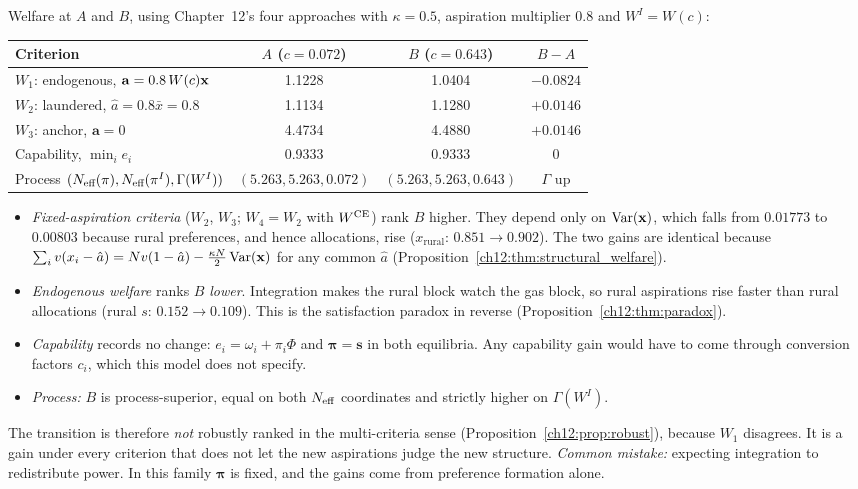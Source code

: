 \documentclass[../solutions_manual.tex]{subfiles}
\begin{document}
 Welfare at $A$ and $B$, using Chapter~12's four approaches with $\kappa = 0.5$, aspiration multiplier $0.8$ and $W^I = W(c)$:
\begin{center}
\small
\begin{tabular}{lccc}
\toprule
Criterion & $A$ ($c = 0.072$) & $B$ ($c = 0.643$) & $B - A$ \\
\midrule
$W_1$: endogenous, $\mathbf{a} = 0.8\,W(c)\mathbf{x}$ & 1.1228 & 1.0404 & $-0.0824$ \\
$W_2$: laundered, $\hat a = 0.8\bar x = 0.8$ & 1.1134 & 1.1280 & $+0.0146$ \\
$W_3$: anchor, $\mathbf{a} = 0$ & 4.4734 & 4.4880 & $+0.0146$ \\
Capability, $\min_i e_i$ & 0.9333 & 0.9333 & 0 \\
Process $(N_{\text{eff}}(\pi), N_{\text{eff}}(\pi^I), \Gamma(W^I))$ & $(5.263, 5.263, 0.072)$ & $(5.263, 5.263, 0.643)$ & $\Gamma$ up \\
\bottomrule
\end{tabular}
\end{center}
\begin{itemize}
\item \emph{Fixed-aspiration criteria} ($W_2$, $W_3$; $W_4 = W_2$ with $W^{\text{CE}}$) rank $B$ higher. They depend only on $\operatorname{Var}(\mathbf{x})$, which falls from $0.01773$ to $0.00803$ because rural preferences, and hence allocations, rise ($x_{\text{rural}}$: $0.851 \to 0.902$). The two gains are identical because $\sum_i v(x_i - \hat a) = Nv(1 - \hat a) - \frac{\kappa N}{2}\operatorname{Var}(\mathbf{x})$ for any common $\hat a$ (Proposition~\ref{ch12:thm:structural_welfare}).
\item \emph{Endogenous welfare} ranks $B$ \emph{lower}. Integration makes the rural block watch the gas block, so rural aspirations rise faster than rural allocations (rural $s$: $0.152 \to 0.109$). This is the satisfaction paradox in reverse (Proposition~\ref{ch12:thm:paradox}).
\item \emph{Capability} records no change: $e_i = \omega_i + \pi_i\Phi$ and $\boldsymbol{\pi} = \mathbf{s}$ in both equilibria. Any capability gain would have to come through conversion factors $c_i$, which this model does not specify.
\item \emph{Process:} $B$ is process-superior, equal on both $N_{\text{eff}}$ coordinates and strictly higher on $\Gamma(W^I)$.
\end{itemize}
The transition is therefore \emph{not} robustly ranked in the multi-criteria sense (Proposition~\ref{ch12:prop:robust}), because $W_1$ disagrees. It is a gain under every criterion that does not let the new aspirations judge the new structure. \textit{Common mistake:} expecting integration to redistribute power. In this family $\boldsymbol{\pi}$ is fixed, and the gains come from preference formation alone.
\end{document}
